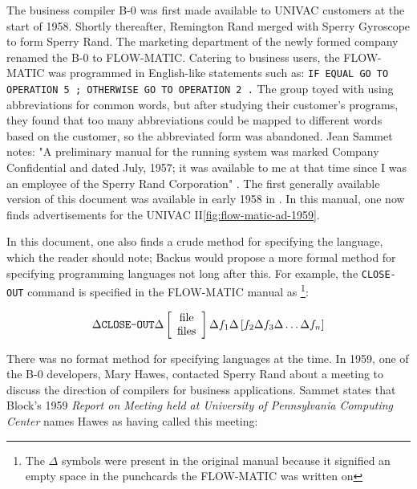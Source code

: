 The business compiler B-0 was first made available to UNIVAC customers
at the start of 1958.
Shortly thereafter, Remington Rand merged with Sperry Gyroscope to form Sperry Rand.
The marketing department of the newly formed company renamed the B-0
to FLOW-MATIC.
Catering to business users, the FLOW-MATIC was programmed in English-like
statements such as:
\texttt{IF EQUAL GO TO OPERATION 5 ; OTHERWISE GO TO OPERATION 2 .}
The group toyed with using abbreviations for common words, but
after studying their customer's programs, they found that too many
abbreviations could be mapped to different words based on the customer,
so the abbreviated form was abandoned.
Jean Sammet notes: "A preliminary manual
for the running system was marked Company Confidential and dated July,
1957; it was available to me at that time since I was an employee of the
Sperry Rand Corporation"
\cite{sammet_programming_languages_history_and_fundamentals_1969}.
The first generally available version of this document was available
in early 1958 in \cite{sperryrand_1959_flowmatic}.
In this manual, one now finds advertisements for the UNIVAC II\ref{fig:flow-matic-ad-1959}.

In this document, one also finds a crude method for specifying the language,
which the reader should note; Backus would propose a more formal method
for specifying programming languages not long after this.
For example, the \texttt{CLOSE-OUT} command is specified in the FLOW-MATIC manual as
\footnote{The $\Delta$ symbols were present in the original manual because it signified
	an empty space in the punchcards the FLOW-MATIC was written on}:

\[
	\Delta \text{\texttt{CLOSE-OUT}} \Delta
	\left[
		\begin{array}{c}
			\text{file} \\
			\text{files}
		\end{array}
		\right]
	\Delta
	f_1
	\Delta
	\left[
		f_2
		\Delta
		f_3
		\Delta
		\dots
		\Delta
		f_n
		\right]
\]

There was no format method for specifying languages at the time.
In 1959, one of the B-0 developers, Mary Hawes, contacted Sperry Rand about a meeting to
discuss the direction of compilers for business applications.
Sammet states\cite{sammet_early_history_of_cobol_1978} that Block's 1959
\textit{Report on Meeting held at University of Pennsylvania Computing Center} names
Hawes as having called this meeting:


